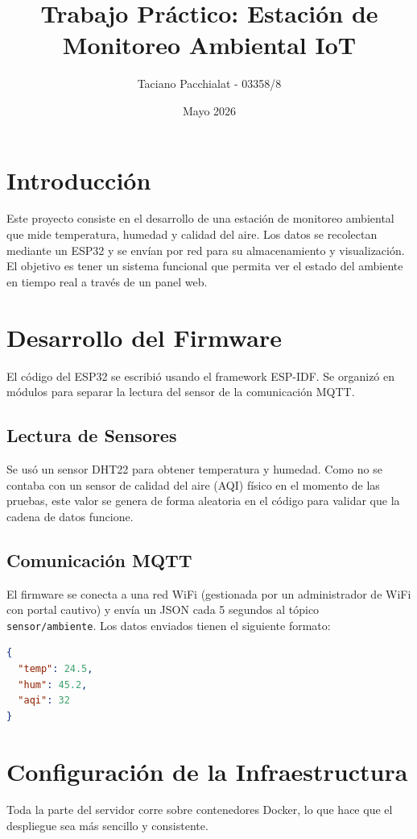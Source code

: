 \documentclass[11pt,a4paper]{article}
\title{Trabajo Práctico: Estación de Monitoreo Ambiental IoT}
\author{Taciano Pacchialat - 03358/8}
\date{Mayo 2026}
\begin{document}
\maketitle

\section{Introducción}
Este proyecto consiste en el desarrollo de una estación de monitoreo ambiental que mide temperatura, humedad y calidad del aire. Los datos se recolectan mediante un ESP32 y se envían por red para su almacenamiento y visualización. El objetivo es tener un sistema funcional que permita ver el estado del ambiente en tiempo real a través de un panel web.

\section{Desarrollo del Firmware}
El código del ESP32 se escribió usando el framework ESP-IDF. Se organizó en módulos para separar la lectura del sensor de la comunicación MQTT.

\subsection{Lectura de Sensores}
Se usó un sensor DHT22 para obtener temperatura y humedad. Como no se contaba con un sensor de calidad del aire (AQI) físico en el momento de las pruebas, este valor se genera de forma aleatoria en el código para validar que la cadena de datos funcione.

\subsection{Comunicación MQTT}
El firmware se conecta a una red WiFi (gestionada por un administrador de WiFi con portal cautivo) y envía un JSON cada 5 segundos al tópico \texttt{sensor/ambiente}. Los datos enviados tienen el siguiente formato:
\begin{lstlisting}[language=json]
{
  "temp": 24.5,
  "hum": 45.2,
  "aqi": 32
}
\end{lstlisting}

\section{Configuración de la Infraestructura}
Toda la parte del servidor corre sobre contenedores Docker, lo que hace que el despliegue sea más sencillo y consistente.
\end{document}
